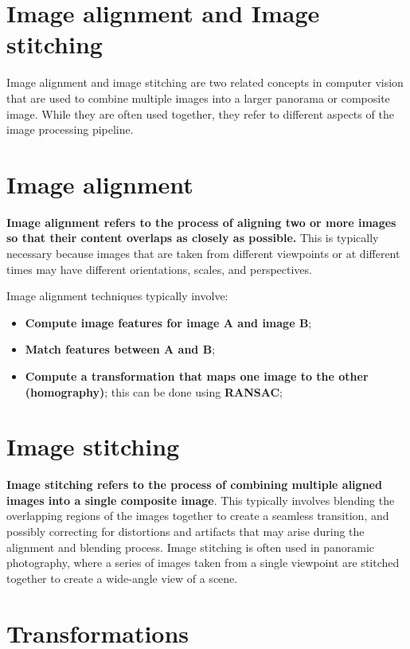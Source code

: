 \documentclass{article}
\begin{document}
\section*{Image alignment and Image stitching}

Image alignment and image stitching are two related concepts in computer vision that are used to combine multiple images into a larger panorama or composite image. While they are often used together, they refer to different aspects of the image processing pipeline.

\section*{Image alignment}

\textbf{Image alignment refers to the process of aligning two or more images so that their content overlaps as closely as possible.} This is typically necessary because images that are taken from different viewpoints or at different times may have different orientations, scales, and perspectives.

Image alignment techniques typically involve:
\begin{itemize}
    \item \textbf{Compute image features for image A and image B};
    \item \textbf{Match features between A and B};
    \item \textbf{Compute a transformation that maps one image to the other (homography)}; this can be done using \textbf{RANSAC};
\end{itemize}

\section*{Image stitching}

\textbf{Image stitching refers to the process of combining multiple aligned images into a single composite image}. This typically involves blending the overlapping regions of the images together to create a seamless transition, and possibly correcting for distortions and artifacts that may arise during the alignment and blending process. Image stitching is often used in panoramic photography, where a series of images taken from a single viewpoint are stitched together to create a wide-angle view of a scene.

\newpage

\section*{Transformations}
\end{document}
